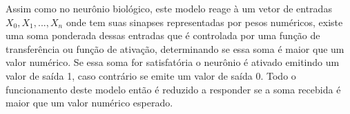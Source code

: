 \documentclass[	12pt, Times, openright, twoside, a4paper, english, brazil]{abntex2}
\begin{document}
            \begin{figure}[H]
            \end{figure}

            Assim como no neurônio biológico, este modelo reage à um vetor de entradas $X_0,X_1,...,X_n$ onde tem suas sinapses representadas por pesos numéricos, existe uma soma ponderada dessas entradas que é controlada por uma função de transferência ou função de ativação, determinando se essa soma é maior que um valor numérico. Se essa soma for satisfatória o neurônio é ativado emitindo um valor de saída 1, caso contrário se emite um valor de saída 0.
            Todo o funcionamento deste modelo então é reduzido a responder se a soma recebida é maior que um valor numérico esperado.
\end{document}
